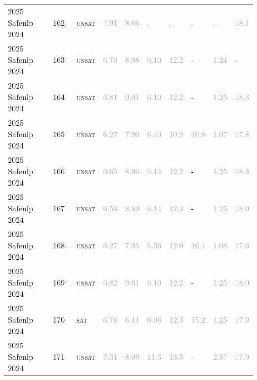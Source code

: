 \begin{center}
{\begin{longtable}{@{}llllllllll@{}}
2025 Safenlp 2024 & 162 & ~\textsc{unsat} & \textcolor{darkgray}{7.91} & \textcolor{darkgray}{8.66} & - & - & - & - & \textcolor{darkgray}{18.1} \\
2025 Safenlp 2024 & 163 & ~\textsc{unsat} & \textcolor{darkgray}{6.70} & \textcolor{darkgray}{8.98} & \textcolor{darkgray}{6.10} & \textcolor{darkgray}{12.2} & - & \textcolor{darkgray}{1.24} & - \\
2025 Safenlp 2024 & 164 & ~\textsc{unsat} & \textcolor{darkgray}{6.81} & \textcolor{darkgray}{9.01} & \textcolor{darkgray}{6.10} & \textcolor{darkgray}{12.2} & - & \textcolor{darkgray}{1.25} & \textcolor{darkgray}{18.3} \\
2025 Safenlp 2024 & 165 & ~\textsc{unsat} & \textcolor{darkgray}{6.27} & \textcolor{darkgray}{7.90} & \textcolor{darkgray}{6.40} & \textcolor{darkgray}{10.9} & \textcolor{darkgray}{16.8} & \textcolor{darkgray}{1.07} & \textcolor{darkgray}{17.8} \\
2025 Safenlp 2024 & 166 & ~\textsc{unsat} & \textcolor{darkgray}{6.65} & \textcolor{darkgray}{8.06} & \textcolor{darkgray}{6.14} & \textcolor{darkgray}{12.2} & - & \textcolor{darkgray}{1.25} & \textcolor{darkgray}{18.3} \\
2025 Safenlp 2024 & 167 & ~\textsc{unsat} & \textcolor{darkgray}{6.53} & \textcolor{darkgray}{8.89} & \textcolor{darkgray}{6.14} & \textcolor{darkgray}{12.3} & - & \textcolor{darkgray}{1.25} & \textcolor{darkgray}{18.0} \\
2025 Safenlp 2024 & 168 & ~\textsc{unsat} & \textcolor{darkgray}{6.27} & \textcolor{darkgray}{7.95} & \textcolor{darkgray}{6.36} & \textcolor{darkgray}{12.0} & \textcolor{darkgray}{16.4} & \textcolor{darkgray}{1.08} & \textcolor{darkgray}{17.6} \\
2025 Safenlp 2024 & 169 & ~\textsc{unsat} & \textcolor{darkgray}{6.82} & \textcolor{darkgray}{9.01} & \textcolor{darkgray}{6.10} & \textcolor{darkgray}{12.2} & - & \textcolor{darkgray}{1.25} & \textcolor{darkgray}{18.0} \\
2025 Safenlp 2024 & 170 & ~\textsc{sat} & \textcolor{darkgray}{6.76} & \textcolor{darkgray}{6.11} & \textcolor{darkgray}{6.06} & \textcolor{darkgray}{12.3} & \textcolor{darkgray}{15.2} & \textcolor{darkgray}{1.25} & \textcolor{darkgray}{17.9} \\
2025 Safenlp 2024 & 171 & ~\textsc{unsat} & \textcolor{darkgray}{7.31} & \textcolor{darkgray}{8.09} & \textcolor{darkgray}{11.3} & \textcolor{darkgray}{13.5} & - & \textcolor{darkgray}{2.57} & \textcolor{darkgray}{17.9} \\

\end{longtable}}
\end{center}
